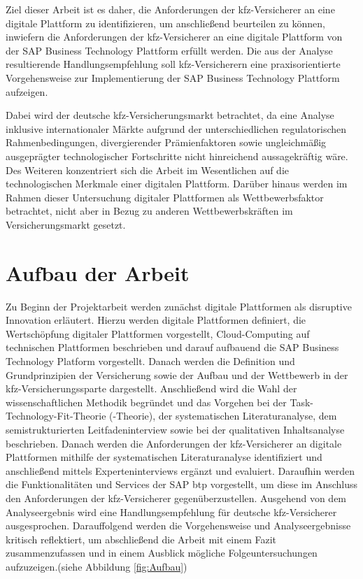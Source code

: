 Ziel dieser Arbeit ist es daher, die Anforderungen der \ac{kfz}-Versicherer an eine digitale Plattform zu identifizieren, um anschließend beurteilen zu können, inwiefern die Anforderungen der \ac{kfz}-Versicherer an eine digitale Plattform von der SAP Business Technology Plattform erfüllt werden. Die aus der Analyse resultierende Handlungsempfehlung soll \ac{kfz}-Versicherern eine praxisorientierte Vorgehensweise zur Implementierung der SAP Business Technology Plattform aufzeigen.

Dabei wird der deutsche \ac{kfz}-Versicherungsmarkt betrachtet, da eine Analyse inklusive internationaler Märkte aufgrund der unterschiedlichen regulatorischen Rahmenbedingungen, divergierender Prämienfaktoren sowie ungleichmäßig ausgeprägter technologischer Fortschritte nicht hinreichend aussagekräftig wäre. Des Weiteren konzentriert sich die Arbeit im Wesentlichen auf die technologischen Merkmale einer digitalen Plattform. Darüber hinaus werden im Rahmen dieser Untersuchung digitaler Plattformen als Wettbewerbsfaktor betrachtet, nicht aber in Bezug zu anderen Wettbewerbskräften im Versicherungsmarkt gesetzt.




\section{Aufbau der Arbeit}

Zu Beginn der Projektarbeit werden zunächst digitale Plattformen als disruptive Innovation erläutert. Hierzu werden digitale Plattformen definiert, die Wertschöpfung digitaler Plattformen vorgestellt, Cloud-Computing auf technischen Plattformen beschrieben und darauf aufbauend die SAP Business Technology Platform vorgestellt. Danach werden die Definition und Grundprinzipien der Versicherung sowie der Aufbau und der Wettbewerb in der \ac{kfz}-Versicherungssparte dargestellt. Anschließend wird die Wahl der wissenschaftlichen Methodik begründet und das Vorgehen bei der Task-Technology-Fit-Theorie (-Theorie), der systematischen Literaturanalyse, dem semistrukturierten Leitfadeninterview sowie bei der qualitativen Inhaltsanalyse beschrieben. Danach werden die Anforderungen der \ac{kfz}-Versicherer an digitale Plattformen mithilfe der systematischen Literaturanalyse identifiziert und anschließend mittels Experteninterviews ergänzt und evaluiert. Daraufhin werden die Funktionalitäten und Services der SAP \ac{btp} vorgestellt, um diese im Anschluss den Anforderungen der \ac{kfz}-Versicherer gegenüberzustellen. Ausgehend von dem Analyseergebnis wird eine Handlungsempfehlung für deutsche \ac{kfz}-Versicherer ausgesprochen. Darauffolgend werden die Vorgehensweise und Analyseergebnisse kritisch reflektiert, um abschließend die Arbeit mit einem Fazit zusammenzufassen und in einem Ausblick mögliche Folgeuntersuchungen aufzuzeigen.(siehe Abbildung \ref{fig:Aufbau})


